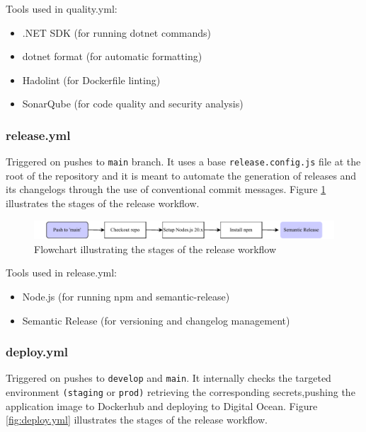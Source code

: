 \noindent  Tools used in quality.yml:

\begin{itemize}
    \item .NET SDK (for running dotnet commands)
    \item dotnet format (for automatic formatting)
    \item Hadolint (for Dockerfile linting)
    \item SonarQube (for code quality and security analysis)
\end{itemize}

\subsubsection{release.yml}
Triggered on pushes to \texttt{main} branch. It uses a base \texttt{release.config.js} file at the root of the repository and it is meant to automate the generation of releases and its changelogs through the use of conventional commit messages. Figure \ref{fig:release.yml} illustrates the stages of the release workflow.

\begin{figure}[H]
    \centering
    \includegraphics[width=\textwidth]{images/figures/Release.pdf}
    \caption{Flowchart illustrating the stages of the release workflow}
    \label{fig:release.yml}
\end{figure}

\noindent  Tools used in release.yml:
\begin{itemize}
    \item Node.js (for running npm and semantic-release)
    \item Semantic Release (for versioning and changelog management)
\end{itemize}

\subsubsection{deploy.yml}
Triggered on pushes to \texttt{develop} and \texttt{main}. It internally checks the targeted environment \texttt{(staging} or \texttt{prod)} retrieving the corresponding secrets,pushing the application image to Dockerhub and deploying to Digital Ocean. Figure \ref{fig:deploy.yml} illustrates the stages of the release workflow.


